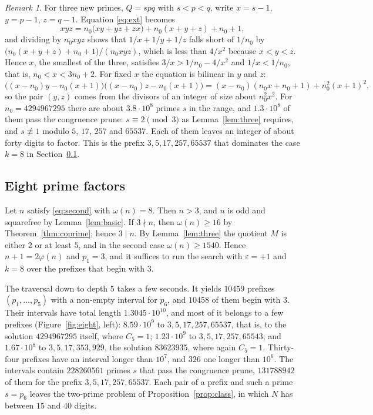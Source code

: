 \documentclass[11pt,reqno]{amsart}
\numberwithin{equation}{section}
\theoremstyle{plain}
\theoremstyle{definition}
\theoremstyle{remark}
\newtheorem{remark}[theorem]{Remark}
\begin{document}
\begin{remark}\label{rem:three}
For three new primes, $Q=spq$ with $s<p<q$, write $x=s-1$, $y=p-1$, $z=q-1$.
Equation \eqref{eq:ext} becomes
\[
  xyz=n_0\bigl(xy+yz+zx\bigr)+n_0(x+y+z)+n_0+1 ,
\]
and dividing by $n_0xyz$ shows that $1/x+1/y+1/z$ falls short of
$1/n_0$ by $\bigl(n_0(x+y+z)+n_0+1\bigr)/(n_0xyz)$, which is less than
$4/x^2$ because $x<y<z$. Hence $x$, the smallest of the three,
satisfies $3/x>1/n_0-4/x^2$ and $1/x<1/n_0$, that is,
$n_0<x<3n_0+2$. For
fixed $x$ the equation is bilinear in $y$ and $z$:
\[
  \bigl((x-n_0)y-n_0(x+1)\bigr)\bigl((x-n_0)z-n_0(x+1)\bigr)
  =(x-n_0)(n_0x+n_0+1)+n_0^2(x+1)^2 ,
\]
so the pair $(y,z)$ comes from the divisors of an integer of size about
$n_0^2x^2$. For $n_0=4294967295$ there are about $3.8\cdot10^8$
primes $s$ in the range, and $1.3\cdot10^8$ of them pass the
congruence prune: $s\equiv2\pmod3$ as Lemma~\ref{lem:three} requires,
and $s\not\equiv1$ modulo $5$, $17$, $257$ and $65537$. Each of them
leaves an integer of about forty digits to factor. This is the prefix $3,5,17,257,65537$ that
dominates the case $k=8$ in Section~\ref{sec:eight}.
\end{remark}

\subsection{Eight prime factors}\label{sec:eight}
Let $n$ satisfy \eqref{eq:second} with $\omega(n)=8$. Then $n>3$, and
$n$ is odd and squarefree by Lemma~\ref{lem:basic}. If $3\nmid n$, then
$\omega(n)\ge16$ by Theorem~\ref{thm:coprime}; hence $3\mid n$. By
Lemma~\ref{lem:three} the quotient $M$ is either $2$ or at least $5$,
and in the second case $\omega(n)\ge1540$. Hence $n+1=2\varphi(n)$ and
$p_1=3$, and it suffices to run the search with $\varepsilon=+1$ and
$k=8$ over the prefixes that begin with $3$.

The traversal down to depth $5$ takes a few seconds. It yields $10459$
prefixes $(p_1,\dots,p_5)$ with a non-empty interval for $p_6$, and
$10458$ of them begin with $3$. Their intervals have total length
$1.3045\cdot10^{10}$, and most of it belongs to a few prefixes
(Figure~\ref{fig:eight}, left): $8.59\cdot10^9$ to $3,5,17,257,65537$,
that is, to the solution $4294967295$ itself, where $C_5=1$;
$1.23\cdot10^9$ to $3,5,17,257,65543$; and $1.67\cdot10^8$ to
$3,5,17,353,929$, the solution $83623935$, where again $C_5=1$.
Thirty-four prefixes have an interval longer than $10^7$, and $326$
one longer than $10^6$. The intervals contain $228260561$ primes $s$ that
pass the congruence prune, $131788942$ of them for the prefix
$3,5,17,257,65537$. Each pair of a prefix and such a prime $s=p_6$
leaves the two-prime problem of Proposition~\ref{prop:class}, in which
$N$ has between $15$ and $40$ digits.
\end{document}
